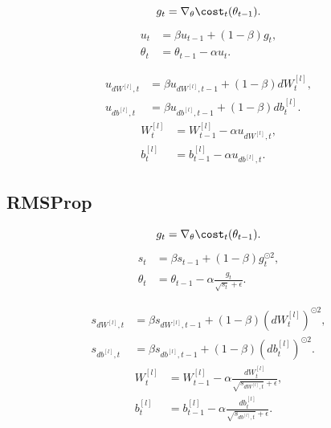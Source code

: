 \[
g_t = \nabla_{\theta}\cost_t(\theta_{t-1}).
\]
\[
\begin{aligned}
u_t
&=
\beta u_{t-1}
+
(1-\beta)g_t,\\
\theta_t
&=
\theta_{t-1}
-
\alpha u_t.
\end{aligned}
\]

\[
\begin{aligned}
u_{dW^{[l]},t}
&=
\beta u_{dW^{[l]},t-1}
+
(1-\beta)dW^{[l]}_t,\\
u_{db^{[l]},t}
&=
\beta u_{db^{[l]},t-1}
+
(1-\beta)db^{[l]}_t.
\end{aligned}
\]
\[
\begin{aligned}
W^{[l]}_t
&=
W^{[l]}_{t-1}
-
\alpha u_{dW^{[l]},t},\\
b^{[l]}_t
&=
b^{[l]}_{t-1}
-
\alpha u_{db^{[l]},t}.
\end{aligned}
\]

\subsection{RMSProp}

\[
g_t = \nabla_{\theta}\cost_t(\theta_{t-1}).
\]
\[
\begin{aligned}
s_t
&=
\beta s_{t-1}
+
(1-\beta)g_t^{\odot 2},\\
\theta_t
&=
\theta_{t-1}
-
\alpha
\frac{g_t}{\sqrt{s_t}+\epsilon}.
\end{aligned}
\]

\[
\begin{aligned}
s_{dW^{[l]},t}
&=
\beta s_{dW^{[l]},t-1}
+
(1-\beta)(dW^{[l]}_t)^{\odot 2},\\
s_{db^{[l]},t}
&=
\beta s_{db^{[l]},t-1}
+
(1-\beta)(db^{[l]}_t)^{\odot 2}.
\end{aligned}
\]
\[
\begin{aligned}
W^{[l]}_t
&=
W^{[l]}_{t-1}
-
\alpha
\frac{dW^{[l]}_t}{\sqrt{s_{dW^{[l]},t}}+\epsilon},\\
b^{[l]}_t
&=
b^{[l]}_{t-1}
-
\alpha
\frac{db^{[l]}_t}{\sqrt{s_{db^{[l]},t}}+\epsilon}.
\end{aligned}
\]

